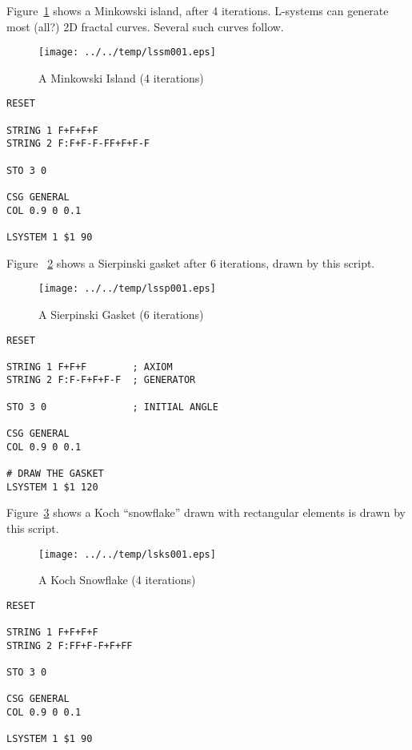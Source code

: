 \documentclass[a4paper,twoside,11pt]{article}
\makeatletter
\def\maxwidth{%
  \ifdim\Gin@nat@width>\linewidth
    \linewidth
  \else
    \Gin@nat@width
  \fi
}
\newcommand{\newpara}{\par\vspace{4mm}\noindent}
\makeatother
\begin{document}
\newpara
Figure~\ref{fig:lssm001} shows a Minkowski island, after 4 iterations.
L-systems can generate most
(all?) 2D fractal curves. Several such curves follow.

\begin{figure}
  \centering
  \texttt{[image: ../../temp/lssm001.eps]}
  \caption{A Minkowski Island (4 iterations)}
  \label{fig:lssm001}
\end{figure}

\begin{lstlisting}
RESET

STRING 1 F+F+F+F
STRING 2 F:F+F-F-FF+F+F-F

STO 3 0

CSG GENERAL
COL 0.9 0 0.1

LSYSTEM 1 $1 90
\end{lstlisting}

\newpara
Figure ~\ref{fig:lssp001} shows a 
Sierpinski gasket after 6 iterations, drawn by this script.

\begin{figure}
  \centering
  \texttt{[image: ../../temp/lssp001.eps]}
  \caption{A Sierpinski Gasket (6 iterations)}
  \label{fig:lssp001}
\end{figure}

\begin{lstlisting}
RESET

STRING 1 F+F+F        ; AXIOM
STRING 2 F:F-F+F+F-F  ; GENERATOR

STO 3 0               ; INITIAL ANGLE

CSG GENERAL
COL 0.9 0 0.1

# DRAW THE GASKET
LSYSTEM 1 $1 120
\end{lstlisting}

\newpara
Figure~\ref{fig:lsks001} shows a Koch ``snowflake'' drawn with rectangular elements
is drawn by this script.

\begin{figure}
  \centering
  \texttt{[image: ../../temp/lsks001.eps]}
  \caption{A Koch Snowflake (4 iterations)}
  \label{fig:lsks001}
\end{figure}

\begin{lstlisting}
RESET

STRING 1 F+F+F+F
STRING 2 F:FF+F-F+F+FF

STO 3 0

CSG GENERAL
COL 0.9 0 0.1

LSYSTEM 1 $1 90
\end{lstlisting}
\end{document}

